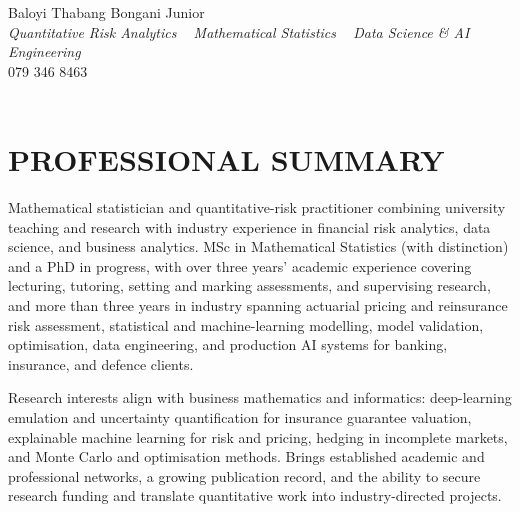 \documentclass[letterpaper,11pt]{article}
\begin{document}


\begin{center}
    {\huge Baloyi Thabang Bongani Junior} \\ \vspace{2pt}
    {\large\textit{Quantitative Risk Analytics \textbar~ Mathematical Statistics \textbar~ Data Science \& AI Engineering}} \\ \vspace{4pt}
    {079 346 8463} ~\textbar~
    \href{mailto:Baloyibongani1@gmail.com}{\color{blue}{Baloyibongani1@gmail.com}} \\ \vspace{1pt}
    \href{https://www.linkedin.com/in/thabang-bongani-junior-baloyi-2622b0286/}{\color{blue}{linkedin.com/in/thabang-bongani-junior-baloyi}} ~\textbar~
    \href{https://github.com/thabangTheActuaryCoder}{\color{blue}{github.com/thabangTheActuaryCoder}} ~\textbar~
    \href{https://orcid.org/0009-0004-7541-7959}{\color{blue}{ORCID 0009-0004-7541-7959}}
    \vspace{-7pt}
\end{center}

\section{\color{airforceblue}PROFESSIONAL SUMMARY}
\vspace{4pt}
{\small
\noindent
Mathematical statistician and quantitative-risk practitioner combining university teaching and
research with industry experience in financial risk analytics, data science, and business
analytics. MSc in Mathematical Statistics (with distinction) and a PhD in progress, with over
three years' academic experience covering lecturing, tutoring, setting and marking assessments,
and supervising research, and more than three years in industry spanning actuarial pricing and
reinsurance risk assessment, statistical and machine-learning modelling, model validation,
optimisation, data engineering, and production AI systems for banking, insurance, and defence
clients.

\vspace{4pt}

\noindent
Research interests align with business mathematics and informatics: deep-learning emulation and
uncertainty quantification for insurance guarantee valuation, explainable machine learning for
risk and pricing, hedging in incomplete markets, and Monte Carlo and optimisation methods.
Brings established academic and professional networks, a growing publication record, and the
ability to secure research funding and translate quantitative work into industry-directed
projects.
}
\vspace{-2pt}
\end{document}
